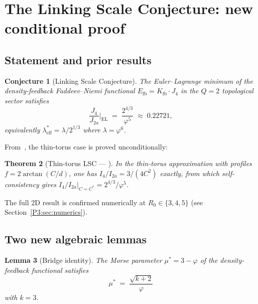 \documentclass[11pt,a4paper]{article}
\newtheorem{theorem}{Theorem}[section]
\newtheorem{lemma}[theorem]{Lemma}
\newtheorem{conjecture}[theorem]{Conjecture}
\theoremstyle{definition}
\theoremstyle{remark}
\newcommand{\vp}{\varphi}
\newcommand{\lam}{\lambda}
\newcommand{\Ja}{J_{2a}}
\newcommand{\Jfour}{J_{4}}
\newcommand{\leff}{\lambda_{\mathrm{eff}}}
\begin{document}
\section{The Linking Scale Conjecture: new conditional proof}
\label{P3:sec:lsc}

\subsection{Statement and prior results}

\begin{conjecture}[Linking Scale Conjecture]
\label{P3:conj:lsc}
The Euler--Lagrange minimum of the density-feedback
Faddeev--Niemi functional
$E_{\mathrm{fb}} = K_{\mathrm{fb}}\cdot J_4$
in the $Q=2$ topological sector satisfies
\begin{equation}
  \frac{\Jfour}{\Ja}\bigg|_{\mathrm{EL}}
  \;=\; \frac{2^{4/3}}{\vp^5}
  \;\approx\; 0.22721,
  \label{P3:eq:lsc}
\end{equation}
equivalently $\leff^* = \lam/2^{1/3}$ where $\lam = \vp^6$.
\end{conjecture}

From~\cite{Paper2}, the thin-torus case is proved unconditionally:

\begin{theorem}[Thin-torus LSC --- \cite{Paper2}]
\label{P3:thm:lsc_1d}
In the thin-torus approximation with profiles $f = 2\arctan(C/d)$,
one has $I_4/I_{2a} = 3/(4C^2)$ exactly, from which self-consistency
gives $I_4/I_{2a}\big|_{C=C^*} = 2^{4/3}/\vp^5$.
\end{theorem}

The full 2D result is confirmed numerically at $R_0\in\{3,4,5\}$
(see Section~\ref{P3:sec:numerics}).

\subsection{Two new algebraic lemmas}

\begin{lemma}[Bridge identity]
\label{P3:lem:bridge}
The Morse parameter $\mu^* = 3-\vp$ of the density-feedback
functional satisfies
\begin{equation}
  \mu^* \;=\; \frac{\sqrt{k+2}}{\vp}
  \label{P3:eq:bridge}
\end{equation}
with $k=3$.
\end{lemma}
\end{document}

